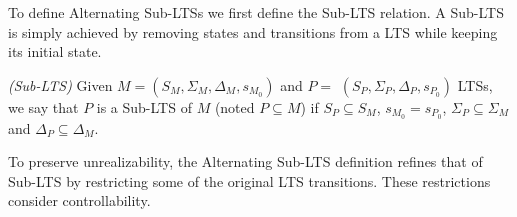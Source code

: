 

To define Alternating Sub-LTSs we first define the Sub-LTS relation.  A Sub-LTS is simply achieved by removing states and transitions from a LTS while keeping its initial state.

\begin{definition}\label{def:lts-inclusion}\emph{(Sub-LTS)}
Given $M = (S_M, \Sigma_M, \Delta_M, s_{M_0})$ and
 $P =$ $(S_P,\Sigma_P,\Delta_P,s_{P_0})$ LTSs, 
we say that $P$ is a Sub-LTS of $M$ (noted $P \subseteq M$) if $S_P \subseteq S_M$,
$s_{M_0} = s_{P_0}$, $\Sigma_P \subseteq \Sigma_M$ and $\Delta_P \subseteq \Delta_M$.
\end{definition}




To preserve unrealizability, the Alternating Sub-LTS definition refines that of Sub-LTS by restricting some of the original LTS transitions. 
These restrictions consider controllability. 



